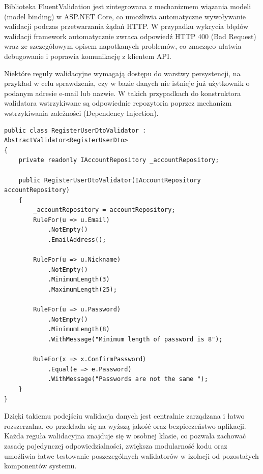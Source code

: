 Biblioteka FluentValidation jest zintegrowana z mechanizmem wiązania modeli (model binding) w ASP.NET Core, co umożliwia automatyczne wywoływanie walidacji podczas przetwarzania żądań HTTP. W przypadku wykrycia błędów walidacji framework automatycznie zwraca odpowiedź HTTP 400 (Bad Request) wraz ze szczegółowym opisem napotkanych problemów, co znacząco ułatwia debugowanie i poprawia komunikację z klientem API.

Niektóre reguły walidacyjne wymagają dostępu do warstwy persystencji, na przykład w celu sprawdzenia, czy w bazie danych nie istnieje już użytkownik o podanym adresie e-mail lub nazwie. W takich przypadkach do konstruktora walidatora wstrzykiwane są odpowiednie repozytoria poprzez mechanizm wstrzykiwania zależności (Dependency Injection).

\pagebreak

\begin{lstlisting}[language={[Sharp]C}, caption={Przykład walidacji danych użytkownika podczas rejestracji}, label={lst:fluent-validation}]
public class RegisterUserDtoValidator : AbstractValidator<RegisterUserDto>
{
    private readonly IAccountRepository _accountRepository;

    public RegisterUserDtoValidator(IAccountRepository accountRepository)
    {
        _accountRepository = accountRepository;
        RuleFor(u => u.Email)
            .NotEmpty()
            .EmailAddress();

        RuleFor(u => u.Nickname)
            .NotEmpty()
            .MinimumLength(3)
            .MaximumLength(25);

        RuleFor(u => u.Password)
            .NotEmpty()
            .MinimumLength(8)
            .WithMessage("Minimum length of password is 8");

        RuleFor(x => x.ConfirmPassword)
            .Equal(e => e.Password)
            .WithMessage("Passwords are not the same ");
    }
}
\end{lstlisting}


Dzięki takiemu podejściu walidacja danych jest centralnie zarządzana i łatwo rozszerzalna, co przekłada się na wyższą jakość oraz bezpieczeństwo aplikacji. Każda reguła walidacyjna znajduje się w osobnej klasie, co pozwala zachować zasadę pojedynczej odpowiedzialności, zwiększa modularność kodu oraz umożliwia łatwe testowanie poszczególnych walidatorów w izolacji od pozostałych komponentów systemu.



